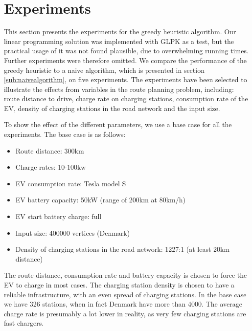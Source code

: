\section{Experiments}
\label{sec:experiments}
This section presents the experiments for the greedy heuristic algorithm. Our linear programming solution was implemented with GLPK as a test, but the practical usage of it was not found plausible, due to overwhelming running times. Further experiments were therefore omitted. We compare the performance of the greedy heuristic to a naive algorithm, which is presented in section \ref{sub:naivealgorithm}, on five experiments. The experiments have been selected to illustrate the effects from variables in the route planning problem, including: route distance to drive, charge rate on charging stations, consumption rate of the EV, density of charging stations in the road network and the input size.

To show the effect of the different parameters, we use a base case for all the experiments. The base case is as follows:
\begin{itemize}

     \item Route distance: 300km
     \item Charge rates: 10-100kw
     \item EV consumption rate: Tesla model S\cite{teslacon}
     \item EV battery capacity: 50kW (range of 200km at 80km/h)
	 \item EV start battery charge: full
	 \item Input size: 400000 vertices (Denmark)
     \item Density of charging stations in the road network: 1227:1 (at least 20km distance)
 \end{itemize} 

The route distance, consumption rate and battery capacity is chosen to force the EV to charge in most cases. The charging station density is chosen to have a reliable infrastructure, with an even spread of charging stations. In the base case we have 326 stations, when in fact Denmark have more than 4000\cite{Globalevoutlook}. The average charge rate is presumably a lot lower in reality, as very few charging stations are fast chargers.


















